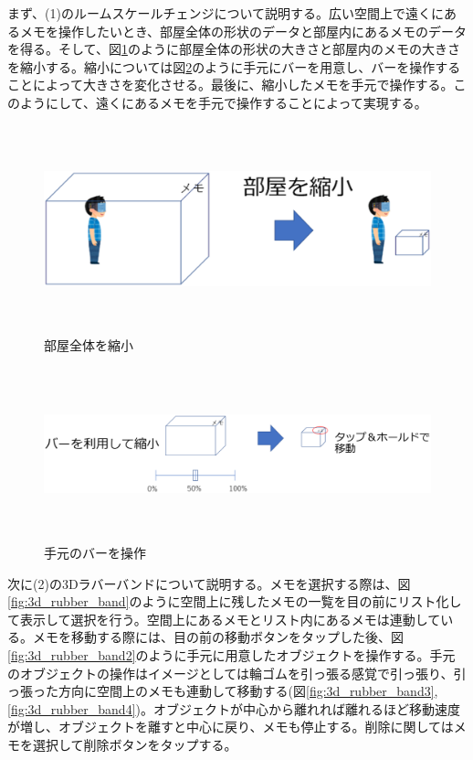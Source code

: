 \documentclass[11pt,a4j, titlepage]{jarticle} %
\begin{document}
まず、(1)のルームスケールチェンジについて説明する。広い空間上で遠くにあるメモを操作したいとき、部屋全体の形状のデータと部屋内にあるメモのデータを得る。そして、図\ref{fig:room_shukusho}のように部屋全体の形状の大きさと部屋内のメモの大きさを縮小する。縮小については図\ref{fig:shukusho_temoto}のように手元にバーを用意し、バーを操作することによって大きさを変化させる。最後に、縮小したメモを手元で操作する。このようにして、遠くにあるメモを手元で操作することによって実現する。

\begin{figure}[H]
  \begin{center}
    \includegraphics[clip,height=6.0cm,width=14.0cm]{./room_shukusho.eps}
    \caption{部屋全体を縮小}
    \label{fig:room_shukusho}
  \end{center}
\end{figure}

\begin{figure}[H]
  \begin{center}
    \includegraphics[clip,height=5.0cm,width=17.0cm]{./shukusho_temoto.eps}
    \caption{手元のバーを操作}
    \label{fig:shukusho_temoto}
  \end{center}
\end{figure}

次に(2)の3Dラバーバンドについて説明する。メモを選択する際は、図\ref{fig:3d_rubber_band}のように空間上に残したメモの一覧を目の前にリスト化して表示して選択を行う。空間上にあるメモとリスト内にあるメモは連動している。メモを移動する際には、目の前の移動ボタンをタップした後、図\ref{fig:3d_rubber_band2}のように手元に用意したオブジェクトを操作する。手元のオブジェクトの操作はイメージとしては輪ゴムを引っ張る感覚で引っ張り、引っ張った方向に空間上のメモも連動して移動する(図\ref{fig:3d_rubber_band3}, \ref{fig:3d_rubber_band4})。オブジェクトが中心から離れれば離れるほど移動速度が増し、オブジェクトを離すと中心に戻り、メモも停止する。削除に関してはメモを選択して削除ボタンをタップする。
\end{document}
